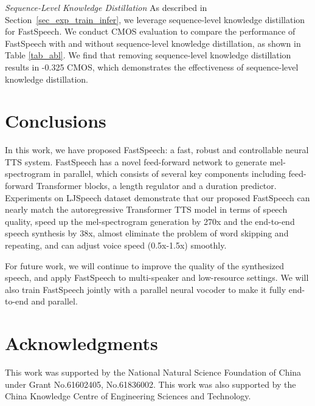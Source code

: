 \documentclass{article}
\begin{document}
\emph{Sequence-Level Knowledge Distillation}
As described in Section~\ref{sec_exp_train_infer}, we leverage sequence-level knowledge distillation for FastSpeech. We conduct CMOS evaluation to compare the performance of FastSpeech with and without sequence-level knowledge distillation, as shown in Table \ref{tab_abl}. We find that removing sequence-level knowledge distillation results in -0.325 CMOS, which demonstrates the effectiveness of sequence-level knowledge distillation.




\section{Conclusions}
In this work, we have proposed FastSpeech: a fast, robust and controllable neural TTS system. FastSpeech has a novel feed-forward network to generate mel-spectrogram in parallel, which consists of several key components including feed-forward Transformer blocks, a length regulator and a duration predictor. Experiments on LJSpeech dataset demonstrate that our proposed FastSpeech can nearly match the autoregressive Transformer TTS model in terms of speech quality, speed up the mel-spectrogram generation by 270x and the end-to-end speech synthesis by 38x, almost eliminate the problem of word skipping and repeating, and can adjust voice speed (0.5x-1.5x) smoothly. 



For future work, we will continue to improve the quality of the synthesized speech, and apply FastSpeech to multi-speaker and low-resource settings. We will also train FastSpeech jointly with a parallel neural vocoder to make it fully end-to-end and parallel.




\section*{Acknowledgments}

This work was supported by the National Natural Science Foundation of China under Grant No.61602405, No.61836002. This work was also supported by the China Knowledge Centre of Engineering Sciences and Technology.





\newpage

\appendix 
\appendixpage
\end{document}
